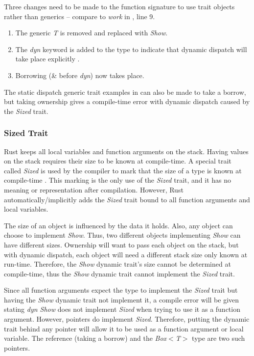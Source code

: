 
Three changes need to be made to the function signature to use trait objects rather than generics -- compare to \textit{work} in , line 9.
\begin{enumerate}
	\item The generic \textit{T} is removed and replaced with \textit{Show}.
	\item The \textit{dyn} keyword is added to the type to indicate that dynamic dispatch will take place explicitly \cite{klabnik_2019_01}.
	\item Borrowing (\& before \textit{dyn}) now takes place.
\end{enumerate}

The static dispatch generic trait examples in  can also be made to take a borrow, but taking ownership gives a compile-time error with dynamic dispatch caused by the \textit{Sized} trait.

\subsubsection{Sized Trait}
Rust keeps all local variables and function arguments on the stack.
Having values on the stack requires their size to be known at compile-time.
A special trait called \textit{Sized} is used by the compiler to mark that the size of a type is known at compile-time \cite{klabnik_2019_01}.
This marking is the only use of the \textit{Sized} trait, and it has no meaning or representation after compilation.
However, Rust automatically/implicitly adds the \textit{Sized} trait bound to all function arguments and local variables.

The size of an object is influenced by the data it holds.
Also, any object can choose to implement \textit{Show}.
Thus, two different objects implementing \textit{Show} can have different sizes.
Ownership will want to pass each object on the stack, but with dynamic dispatch, each object will need a different stack size only known at run-time.
Therefore, the \textit{Show} dynamic trait's size cannot be determined at compile-time, thus the \textit{Show} dynamic trait cannot implement the \textit{Sized} trait.

Since all function arguments expect the type to implement the \textit{Sized} trait but having the \textit{Show} dynamic trait not implement it, a compile error will be given stating \textit{dyn Show} does not implement \textit{Sized} when trying to use it as a function argument.
However, pointers do implement \textit{Sized}.
Therefore, putting the dynamic trait behind any pointer will allow it to be used as a function argument or local variable.
The reference (taking a borrow) and the \textit{Box$<$T$>$} type are two such pointers\cite{klabnik_2019_01}.

